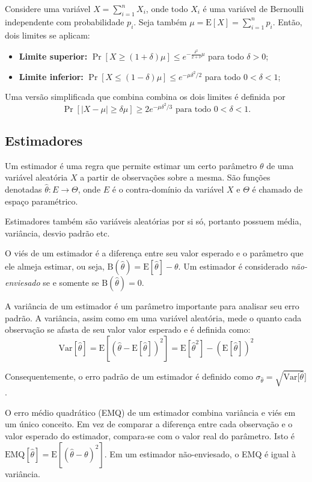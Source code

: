 Considere uma variável $X = \sum_{i=1}^n X_i$, onde todo $X_i$ é uma variável de Bernoulli independente com probabilidade $p_i$. Seja também $\mu = \text{E}[X] = \sum_{i=1}^n p_i$. Então, dois limites se aplicam:

\begin{itemize}
  \item \textbf{Limite superior:} $\Pr[X \geq (1 + \delta)\mu] \leq e^{-\frac{\delta^2}{2+\delta}\mu}$ para todo $\delta > 0$;
  \item \textbf{Limite inferior:} $\Pr[X \leq (1 - \delta)\mu] \leq e^{-\mu\delta^2/2}$ para todo $0 < \delta < 1$;
\end{itemize}

Uma versão simplificada que combina combina os dois limites é definida por
\[
    \Pr[|X - \mu| \geq \delta\mu] \geq 2e^{-\mu\delta^2/3}\text{ para todo } 0 < \delta < 1.
\]

\subsection{Estimadores}

Um estimador é uma regra que permite estimar um certo parâmetro $\theta$ de uma variável aleatória $X$ a partir de observações sobre a mesma. São funções denotadas $\hat{\theta} : E \to \Theta$, onde $E$ é o contra-domínio da variável $X$ e $\Theta$ é chamado de espaço paramétrico.

Estimadores também são variáveis aleatórias por si só, portanto possuem média, variância, desvio padrão etc.

O viés de um estimador é a diferença entre seu valor esperado e o parâmetro que ele almeja estimar, ou seja, $\text{B}(\hat{\theta}) = \text{E}[\hat{\theta}] - \theta$. Um estimador é considerado \emph{não-enviesado} se e somente se $\text{B}(\hat{\theta}) = 0$.

A variância de um estimador é um parâmetro importante para analisar seu erro padrão. A variância, assim como em uma variável aleatória, mede o quanto cada observação se afasta de seu valor valor esperado e é definida como:
\[
    \text{Var}[\hat{\theta}] = \text{E}[(\hat{\theta} - \text{E}[\hat{\theta}])^2] = \text{E}[\hat{\theta}^2] - (\text{E}[\hat{\theta}])^2
\]

Consequentemente, o erro padrão de um estimador é definido como $\sigma_{\hat{\theta}} = \sqrt{\text{Var}[\hat{\theta}}]$.

O erro médio quadrático (EMQ) de um estimador combina variância e viés em um único conceito. Em vez de comparar a diferença entre cada observação e o valor esperado do estimador, compara-se com o valor real do parâmetro. Isto é $\text{EMQ}[\hat{\theta}] = \text{E}[(\hat{\theta} - \theta)^2]$. Em um estimador não-enviesado, o EMQ é igual à variância.

